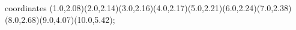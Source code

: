 					coordinates { (1.0,2.08)(2.0,2.14)(3.0,2.16)(4.0,2.17)(5.0,2.21)(6.0,2.24)(7.0,2.38)(8.0,2.68)(9.0,4.07)(10.0,5.42)};
